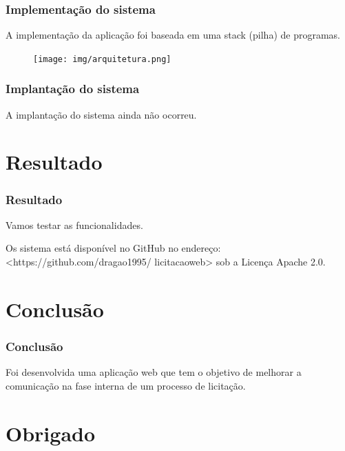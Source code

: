 \documentclass{beamer}
\begin{document}
		\begin{frame}\frametitle{Implementação do sistema}
			A implementação da aplicação foi baseada em uma stack (pilha) de programas.
			\begin{figure}[ht]
				\centering
				\texttt{[image: img/arquitetura.png]}
			\end{figure}
		\end{frame}
	
		\begin{frame}\frametitle{Implantação do sistema}
			A implantação do sistema ainda não ocorreu.
		\end{frame}
	
	\section{Resultado}
		
		\begin{frame}\frametitle{Resultado}
			Vamos testar as funcionalidades.
			
			Os sistema está disponível no GitHub no endereço: <https://github.com/dragao1995/
			licitacaoweb> sob a Licença Apache 2.0.
		\end{frame}

	\section{Conclusão}
	
		\begin{frame}\frametitle{Conclusão}
			Foi desenvolvida uma aplicação web que tem o objetivo de melhorar a comunicação na fase interna de um processo de licitação.
		\end{frame}	
	
	\section{Obrigado}
		
\end{document}
